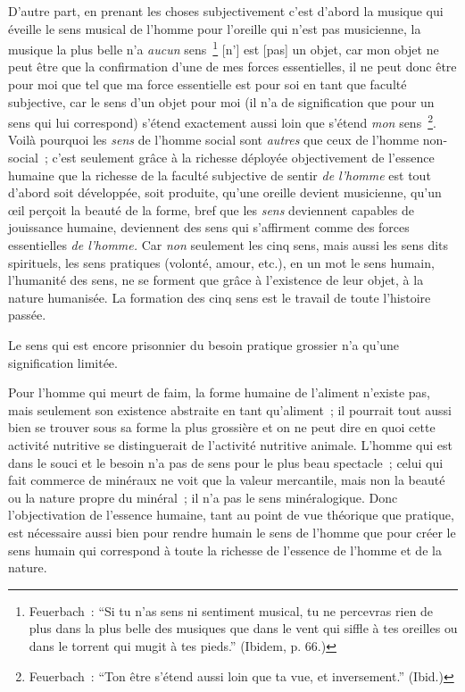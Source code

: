 \documentclass[french,twoside]{book} %
\begin{document}
\bigbreak
\noindent D’autre part, en prenant les choses subjectivement c’est d’abord la musique qui éveille le sens musical de l’homme pour l’oreille qui n’est pas musicienne, la musique la plus belle n’a \emph{aucun} sens \footnote{Feuerbach : “Si tu n’as sens ni sentiment musical, tu ne percevras rien de plus dans la plus belle des musiques que dans le vent qui siffle à tes oreilles ou dans le torrent qui mugit à tes pieds.” (Ibidem, p. 66.)} [n’] est [pas] un objet, car mon objet ne peut être que la confirmation d’une de mes forces essentielles, il ne peut donc être pour moi que tel que ma force essentielle est pour soi en tant que faculté subjective, car le sens d’un objet pour moi (il n’a de signification que pour un sens qui lui correspond) s’étend exactement aussi loin que s’étend \emph{mon} sens \footnote{Feuerbach : “Ton être s’étend aussi loin que ta vue, et inversement.” (Ibid.)}. Voilà pourquoi les \emph{sens} de l’homme social sont \emph{autres} que ceux de l’homme non-social ; c’est seulement grâce à la richesse déployée objectivement de l’essence humaine que la richesse de la faculté subjective de sentir \emph{de l’homme} est tout d’abord soit développée, soit produite, qu’une oreille devient musicienne, qu’un œil perçoit la beauté de la forme, bref que les \emph{sens} deviennent capables de jouissance humaine, deviennent des sens qui s’affirment comme des forces essentielles \emph{de l’homme.} Car \emph{non} seulement les cinq sens, mais aussi les sens dits spirituels, les sens pratiques (volonté, amour, etc.), en un mot le sens humain, l’humanité des sens, ne se forment que grâce à l’existence de leur objet, à la nature humanisée. La formation des cinq sens est le travail de toute l’histoire passée.\par
Le sens qui est encore prisonnier du besoin pratique grossier n’a qu’une signification limitée.\par
Pour l’homme qui meurt de faim, la forme humaine de l’aliment n’existe pas, mais seulement son existence abstraite en tant qu’aliment ; il pourrait tout aussi bien se trouver sous sa forme la plus grossière et on ne peut dire en quoi cette activité nutritive se distinguerait de l’activité nutritive animale. L’homme qui est dans le souci et le besoin n’a pas de sens pour le plus beau spectacle ; celui qui fait commerce de minéraux ne voit que la valeur mercantile, mais non la beauté ou la nature propre du minéral ; il n’a pas le sens minéralogique. Donc l’objectivation de l’essence humaine, tant au point de vue théorique que pratique, est nécessaire aussi bien pour rendre humain le sens de l’homme que pour créer le sens humain qui correspond à toute la richesse de l’essence de l’homme et de la nature.\par
\end{document}

